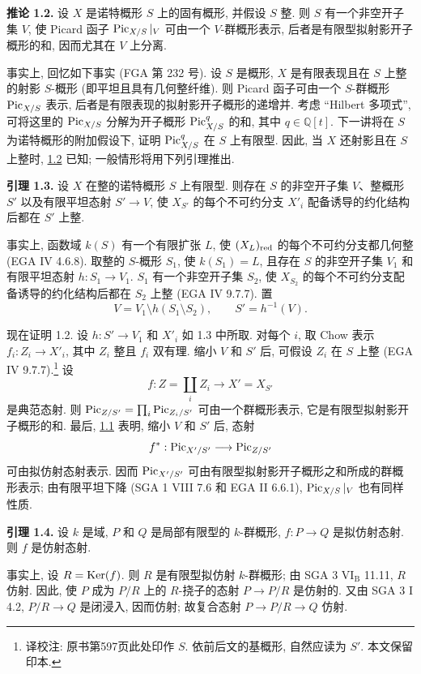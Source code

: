 \textbf{推论 1.2.} 设 $X$ 是诺特概形 $S$ 上的固有概形, 并假设 $S$ 整. 则 $S$ 有一个非空开子集 $V$, 使 Picard 函子 $\operatorname{Pic}_{X/S}|_V$ 可由一个 $V$-群概形表示, 后者是有限型拟射影开子概形的和, 因而尤其在 $V$ 上分离.

事实上, 回忆如下事实 (FGA 第 232 号). 设 $S$ 是概形, $X$ 是有限表现且在 $S$ 上整的射影 $S$-概形 (即平坦且具有几何整纤维). 则 Picard 函子可由一个 $S$-群概形 $\operatorname{Pic}_{X/S}$ 表示, 后者是有限表现的拟射影开子概形的递增并. 考虑 ``Hilbert 多项式'', 可将这里的 $\operatorname{Pic}_{X/S}$ 分解为开子概形 $\operatorname{Pic}^q_{X/S}$ 的和, 其中 $q\in\mathbb Q[t]$. 下一讲将在 $S$ 为诺特概形的附加假设下, 证明 $\operatorname{Pic}^q_{X/S}$ 在 $S$ 上有限型. 因此, 当 $X$ 还射影且在 $S$ 上整时, \hyperlink{sga6.e12.cor.1-2}{1.2} 已知; 一般情形将用下列引理推出.

\textbf{引理 1.3.} 设 $X$ 在整的诺特概形 $S$ 上有限型. 则存在 $S$ 的非空开子集 $V$、整概形 $S'$ 以及有限平坦态射 $S'\to V$, 使 $X_{S'}$ 的每个不可约分支 $X'_i$ 配备诱导的约化结构后都在 $S'$ 上整.

事实上, 函数域 $k(S)$ 有一个有限扩张 $L$, 使 $(X_L)_{\mathrm{red}}$ 的每个不可约分支都几何整 (EGA IV 4.6.8). 取整的 $S$-概形 $S_1$, 使 $k(S_1)=L$, 且存在 $S$ 的非空开子集 $V_1$ 和有限平坦态射 $h:S_1\to V_1$. $S_1$ 有一个非空开子集 $S_2$, 使 $X_{S_2}$ 的每个不可约分支配备诱导的约化结构后都在 $S_2$ 上整 (EGA IV 9.7.7). 置
\[
  V=V_1\setminus h(S_1\setminus S_2),\qquad S'=h^{-1}(V).
\]

现在证明 1.2. 设 $h:S'\to V_1$ 和 $X'_i$ 如 1.3 中所取. 对每个 $i$, 取 Chow 表示 $f_i:Z_i\to X'_i$, 其中 $Z_i$ 整且 $f_i$ 双有理. 缩小 $V$ 和 $S'$ 后, 可假设 $Z_i$ 在 $S$ 上整 (EGA IV 9.7.7).\footnote{译校注: 原书第597页此处印作 $S$. 依前后文的基概形, 自然应读为 $S'$. 本文保留印本.} 设
\[
  f:Z=\coprod_i Z_i\longrightarrow X'=X_{S'}
\]
是典范态射. 则 $\operatorname{Pic}_{Z/S'}=\prod_i\operatorname{Pic}_{Z_i/S'}$ 可由一个群概形表示, 它是有限型拟射影开子概形的和. 最后, \hyperlink{sga6.e12.thm.1-1}{1.1} 表明, 缩小 $V$ 和 $S'$ 后, 态射
\[
  f^*:\operatorname{Pic}_{X'/S'}\longrightarrow\operatorname{Pic}_{Z/S'}
\]
可由拟仿射态射表示. 因而 $\operatorname{Pic}_{X'/S'}$ 可由有限型拟射影开子概形之和所成的群概形表示; 由有限平坦下降 (SGA 1 VIII 7.6 和 EGA II 6.6.1), $\operatorname{Pic}_{X/S}|_V$ 也有同样性质.

\textbf{引理 1.4.} 设 $k$ 是域, $P$ 和 $Q$ 是局部有限型的 $k$-群概形, $f:P\to Q$ 是拟仿射态射. 则 $f$ 是仿射态射.

事实上, 设 $R=\operatorname{Ker}(f)$. 则 $R$ 是有限型拟仿射 $k$-群概形; 由 SGA 3 $\mathrm{VI}_{\mathrm B}$ 11.11, $R$ 仿射. 因此, 使 $P$ 成为 $P/R$ 上的 $R$-挠子的态射 $P\to P/R$ 是仿射的. 又由 SGA 3 I 4.2, $P/R\to Q$ 是闭浸入, 因而仿射; 故复合态射 $P\to P/R\to Q$ 仿射.

